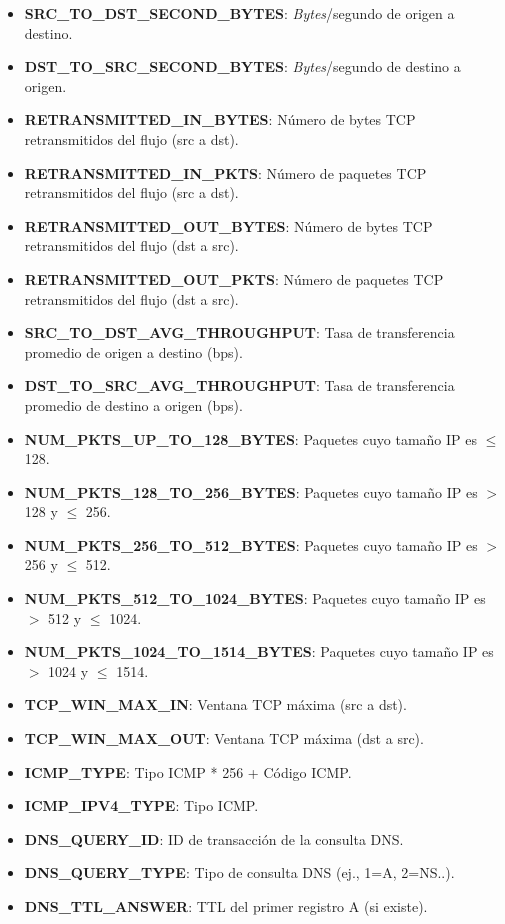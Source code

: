 \begin{itemize}
    \item \textbf{SRC\_TO\_DST\_SECOND\_BYTES}: \textit{Bytes}/segundo de origen a destino.
    \item \textbf{DST\_TO\_SRC\_SECOND\_BYTES}: \textit{Bytes}/segundo de destino a origen.
    \item \textbf{RETRANSMITTED\_IN\_BYTES}: Número de bytes TCP retransmitidos del flujo (src a dst).
    \item \textbf{RETRANSMITTED\_IN\_PKTS}: Número de paquetes TCP retransmitidos del flujo (src a dst).
    \item \textbf{RETRANSMITTED\_OUT\_BYTES}: Número de bytes TCP retransmitidos del flujo (dst a src).
    \item \textbf{RETRANSMITTED\_OUT\_PKTS}: Número de paquetes TCP retransmitidos del flujo (dst a src).
    \item \textbf{SRC\_TO\_DST\_AVG\_THROUGHPUT}: Tasa de transferencia promedio de origen a destino (bps).
    \item \textbf{DST\_TO\_SRC\_AVG\_THROUGHPUT}: Tasa de transferencia promedio de destino a origen (bps).
    \item \textbf{NUM\_PKTS\_UP\_TO\_128\_BYTES}: Paquetes cuyo tamaño IP es $ \leq $ 128.
    \item \textbf{NUM\_PKTS\_128\_TO\_256\_BYTES}: Paquetes cuyo tamaño IP es  $ > $ 128 y $ \leq $ 256.
    \item \textbf{NUM\_PKTS\_256\_TO\_512\_BYTES}: Paquetes cuyo tamaño IP es $ > $ 256 y $ \leq $ 512.
    \item \textbf{NUM\_PKTS\_512\_TO\_1024\_BYTES}: Paquetes cuyo tamaño IP es $ > $ 512 y $ \leq $ 1024.
    \item \textbf{NUM\_PKTS\_1024\_TO\_1514\_BYTES}: Paquetes cuyo tamaño IP es $ > $ 1024 y $ \leq $ 1514.
    \item \textbf{TCP\_WIN\_MAX\_IN}: Ventana TCP máxima (src a dst).
    \item \textbf{TCP\_WIN\_MAX\_OUT}: Ventana TCP máxima (dst a src).
    \item \textbf{ICMP\_TYPE}: Tipo ICMP * 256 + Código ICMP.
    \item \textbf{ICMP\_IPV4\_TYPE}: Tipo ICMP.
    \item \textbf{DNS\_QUERY\_ID}: ID de transacción de la consulta DNS.
    \item \textbf{DNS\_QUERY\_TYPE}: Tipo de consulta DNS (ej., 1=A, 2=NS..).
    \item \textbf{DNS\_TTL\_ANSWER}: TTL del primer registro A (si existe).

\end{itemize}
